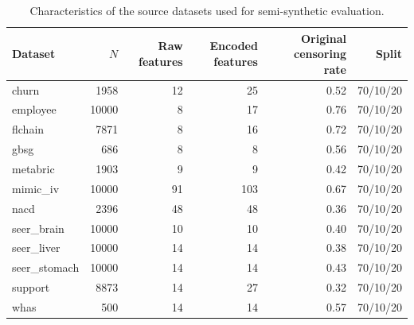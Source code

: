 \begin{table}
\caption{Characteristics of the source datasets used for semi-synthetic evaluation.}
\label{tab:semi_synthetic_datasets}
\begin{tabular}{lrrrrr}
\toprule
Dataset & $N$ & Raw features & Encoded features & Original censoring rate & Split \\
\midrule
churn & 1958 & 12 & 25 & 0.52 & 70/10/20 \\
employee & 10000 & 8 & 17 & 0.76 & 70/10/20 \\
flchain & 7871 & 8 & 16 & 0.72 & 70/10/20 \\
gbsg & 686 & 8 & 8 & 0.56 & 70/10/20 \\
metabric & 1903 & 9 & 9 & 0.42 & 70/10/20 \\
mimic_iv & 10000 & 91 & 103 & 0.67 & 70/10/20 \\
nacd & 2396 & 48 & 48 & 0.36 & 70/10/20 \\
seer_brain & 10000 & 10 & 10 & 0.40 & 70/10/20 \\
seer_liver & 10000 & 14 & 14 & 0.38 & 70/10/20 \\
seer_stomach & 10000 & 14 & 14 & 0.43 & 70/10/20 \\
support & 8873 & 14 & 27 & 0.32 & 70/10/20 \\
whas & 500 & 14 & 14 & 0.57 & 70/10/20 \\
\bottomrule
\end{tabular}
\end{table}

